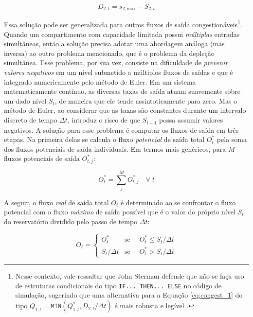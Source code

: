 \documentclass[./main.tex]{subfiles}
\begin{document}
\begin{linenomath*}
\begin{equation} 
	\label{eq:congest_2}
 D_{2,t} = s_{2, \text{max}} - S_{2,t}
\end{equation}
\end{linenomath*}
Essa solução pode ser generalizada para outros fluxos de saída congestionáveis\footnote{Nesse contexto, vale ressaltar que John Sterman defende que não se faça uso de estruturas condicionais do tipo \texttt{IF... THEN... ELSE} no código de simulação, sugerindo que uma alternativa para a Equação \eqref{eq:congest_1} do tipo $Q_{1,t} = \texttt{MIN}(Q^*_{1,t}, D_{2, t} / \Delta t)$ é mais robusta e legível \cite{sterman2000}. }. Quando um compartimento com capacidade limitada possui \textit{múltiplas} entradas simultâneas, então a solução precisa adotar uma abordagem análoga (mas inversa) ao outro problema mencionado, que é o problema da depleção simultânea. Esse problema, por sua vez, consiste na dificuldade de \textit{prevenir valores negativos} em um nível submetido a múltiplos fluxos de saídas e que é integrado numericamente pelo método de Euler. Em um sistema matematicamente contínuo, as diversas taxas de saída atuam suavemente sobre um dado nível $S_t$, de maneira que ele tende assintoticamente para zero. Mas o método de Euler, ao considerar que as taxas são constantes durante um intervalo discreto de tempo $\Delta t$, introduz o risco de que $S_{t+1}$ possa assumir valores negativos. A solução para esse problema é computar os fluxos de saída em três etapas. Na primeira delas se calcula o fluxo \textit{potencial} de saída total $O^*_t$ pela soma dos fluxos potenciais de saída individuais. Em termos mais genéricos, para $M$ fluxos potenciais de saída $O^*_{t,j}$:
\begin{linenomath*}
\begin{equation} 
\label{eq:simult_1}
 O^*_t = \sum_{j}^{M}O^*_{t, j} \quad \forall\;t
\end{equation}
\end{linenomath*}
A seguir, o fluxo \textit{real} de saída total $O_t$ é determinado ao se confrontar o fluxo potencial com o fluxo \textit{máximo} de saída possível que é o valor do próprio nível $S_t$ do reservatório dividido pelo passo de tempo $\Delta t$:
\begin{linenomath*}
\begin{equation} 
	\label{eq:simult_2}
 O_{t} = 
\begin{cases} 
    O^*_t & \text{se } \quad O^*_t \leq S_t / \Delta t\\
    S_t / \Delta t & \text{se } \quad O^*_t > S_t / \Delta t
\end{cases}
\end{equation}
\end{linenomath*}
\end{document}

